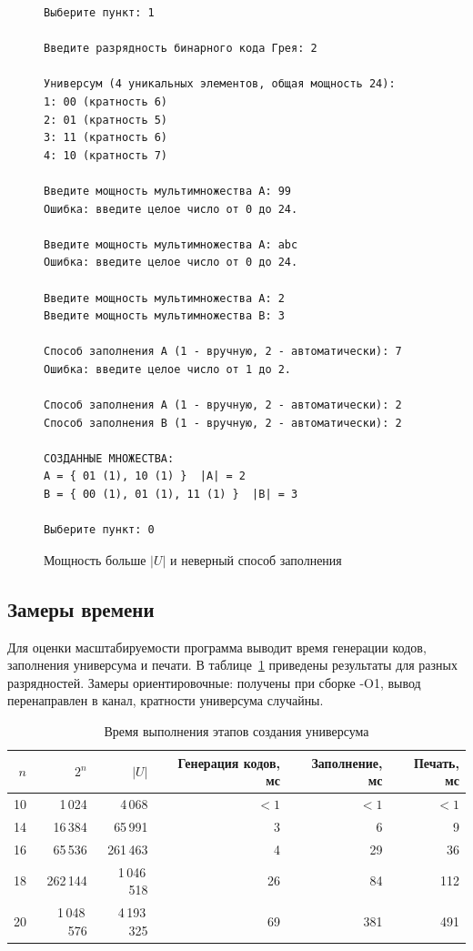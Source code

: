 \documentclass[14pt,a4paper]{extarticle}
\newcommand{\codefont}{\renewcommand{\baselinestretch}{1}\monofont\fontsize{10}{12}\selectfont}
\newcommand{\card}[1]{\left|#1\right|}
\newcommand{\code}[1]{{\monofont #1}}
\begin{document}
\begin{figure}[H]
\begin{Verbatim}[frame=single,framesep=4pt,breaklines=true,formatcom=\codefont]
Выберите пункт: 1

Введите разрядность бинарного кода Грея: 2

Универсум (4 уникальных элементов, общая мощность 24):
1: 00 (кратность 6)
2: 01 (кратность 5)
3: 11 (кратность 6)
4: 10 (кратность 7)

Введите мощность мультимножества A: 99
Ошибка: введите целое число от 0 до 24.

Введите мощность мультимножества A: abc
Ошибка: введите целое число от 0 до 24.

Введите мощность мультимножества A: 2
Введите мощность мультимножества B: 3

Способ заполнения A (1 - вручную, 2 - автоматически): 7
Ошибка: введите целое число от 1 до 2.

Способ заполнения A (1 - вручную, 2 - автоматически): 2
Способ заполнения B (1 - вручную, 2 - автоматически): 2

СОЗДАННЫЕ МНОЖЕСТВА:
A = { 01 (1), 10 (1) }  |A| = 2
B = { 00 (1), 01 (1), 11 (1) }  |B| = 3

Выберите пункт: 0
\end{Verbatim}
\caption{Мощность больше $\card{U}$ и неверный способ заполнения}\label{fig:badpower}
\end{figure}

\subsection{Замеры времени}\label{sec:timing}

Для оценки масштабируемости программа выводит время генерации кодов, заполнения универсума и печати. В таблице~\ref{tab:timing} приведены результаты для разных разрядностей. Замеры ориентировочные: получены при сборке \code{-O1}, вывод перенаправлен в канал, кратности универсума случайны.

\begin{table}[H]
\caption{Время выполнения этапов создания универсума}\label{tab:timing}
\centering\small\singlespacing
\begin{tabular}{rrrrrr}
\toprule
$n$ & $2^n$ & $\card{U}$ & Генерация кодов, мс & Заполнение, мс & Печать, мс \\
\midrule
10 & 1\,024 & 4\,068 & $<1$ & $<1$ & $<1$ \\
14 & 16\,384 & 65\,991 & 3 & 6 & 9 \\
16 & 65\,536 & 261\,463 & 4 & 29 & 36 \\
18 & 262\,144 & 1\,046\,518 & 26 & 84 & 112 \\
20 & 1\,048\,576 & 4\,193\,325 & 69 & 381 & 491 \\
\bottomrule
\end{tabular}
\end{table}
\end{document}
